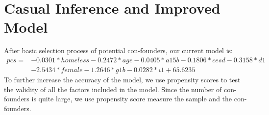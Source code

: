 \documentclass{report}
\begin{document}
\section{Casual Inference and Improved Model}
After basic selection process of potential con-founders, our current model is:  
\begin{align*}
pcs = &-0.0301 * homeless - 0.2472 * age - 0.0405 * a15b - 0.1806 * cesd - 0.3158 * d1\\
& - 2.5434 * female - 1.2646 * g1b - 0.0282 * i1 + 65.6235
\end{align*}
To further increase the accuracy of the model, we use propensity scores to test the validity of all the factors included in the model. Since the number of con-founders is quite large, we use propensity score measure the sample and the con-founders.\\
\end{document}
